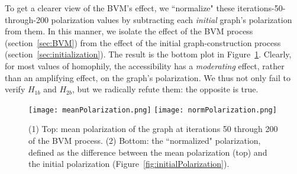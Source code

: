 To get a clearer view of the BVM's effect, we ``normalize" these
iterations-50-through-200 polarization values by subtracting each
\textit{initial} graph's polarization from them. In this manner, we isolate
the effect of the BVM process (section~\ref{sec:BVM}) from the effect of the
initial graph-construction process (section~\ref{sec:initialization}). The
result is the bottom plot in Figure~\ref{fig:meanNormPolarization}. Clearly,
for most values of homophily, the accessibility has a \textit{moderating}
effect, rather than an amplifying effect, on the graph's polarization. We thus
not only fail to verify $H_{1b}$ and $H_{2b}$, but we radically refute them:
the opposite is true.

\begin{figure}
\centering
\texttt{[image: meanPolarization.png]}
\texttt{[image: normPolarization.png]}

\caption{(1) Top: mean polarization of the graph at iterations 50 through 200
of the BVM process. (2) Bottom: the ``normalized" polarization, defined as the
difference between the mean polarization (top) and the initial polarization
(Figure~\ref{fig:initialPolarization}).}
\label{fig:meanNormPolarization}
\end{figure}

